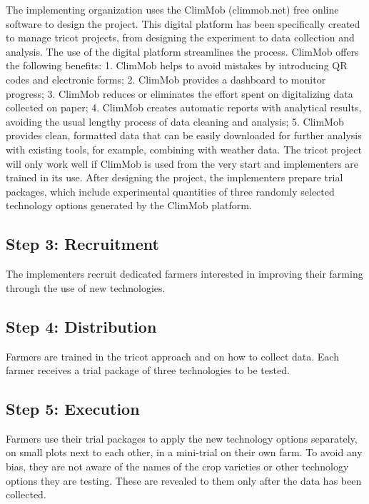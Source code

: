 \documentclass[
]{book}
\begin{document}
The implementing organization uses the ClimMob (climmob.net) free online software to design the project. This digital platform has been specifically created to manage tricot projects, from designing the experiment to data collection and analysis. The use of the digital platform streamlines the process. ClimMob offers the following benefits:
1. ClimMob helps to avoid mistakes by introducing QR codes and electronic forms;
2. ClimMob provides a dashboard to monitor progress;
3. ClimMob reduces or eliminates the effort spent on digitalizing data collected on paper;
4. ClimMob creates automatic reports with analytical results, avoiding the usual lengthy process of data cleaning and analysis;
5. ClimMob provides clean, formatted data that can be easily downloaded for further analysis with existing tools, for example, combining with weather data.
The tricot project will only work well if ClimMob is used from the very start and implementers are trained in its use. After designing the project, the implementers prepare trial packages, which include experimental quantities of three randomly selected technology options generated by the ClimMob platform.

\subsection{Step 3: Recruitment}\label{step-3-recruitment}

The implementers recruit dedicated farmers interested in improving their farming through the use of new technologies.

\subsection{Step 4: Distribution}\label{step-4-distribution}

Farmers are trained in the tricot approach and on how to collect data. Each farmer receives a trial package of three technologies to be tested.

\subsection{Step 5: Execution}\label{step-5-execution}

Farmers use their trial packages to apply the new technology options separately, on small plots next to each other, in a mini-trial on their own farm. To avoid any bias, they are not aware of the names of the crop varieties or other technology options they are testing. These are revealed to them only after the data has been collected.
\end{document}
